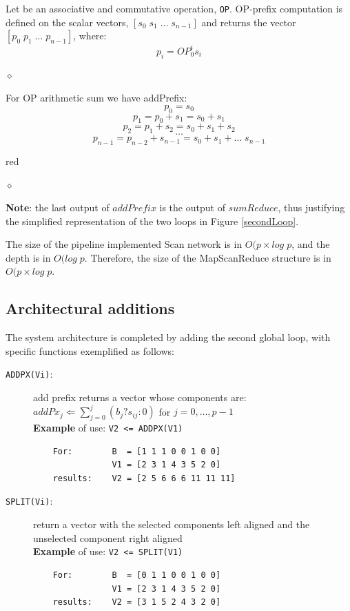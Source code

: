 \begin{definition}
Let be an associative and commutative  operation, {\tt OP}. OP-prefix computation is defined on the scalar vectors, $[s_0 \; s_1 \; \ldots \; s_{n-1}]$ and returns the vector $[p_0 \; p_1 \; \ldots \; p_{n-1}]$, where:
$$ p_i = OP_0^i s_i$$

$\diamond$
\end{definition}
\begin{exemplu}
For OP arithmetic sum we have addPrefix:
$$p_0 = s_0$$
$$p_1 = p_0 + s_1 = s_0 + s_1$$
$$p_2 = p_1 + s_2 = s_0 +s_1 + s_2$$
$$\ldots$$
$$p_{n-1} = p_{n-2} + s_{n-1} = s_0 + s_1 + \ldots \; s_{n-1}$$

 {red}


$\diamond$
\end{exemplu}

{\bf Note}: the last output of $addPrefix$ is the output of $sumReduce$, thus justifying the simplified representation of the two loops in Figure \ref{secondLoop}.

The size of the pipeline implemented Scan network is in $O(p \times log \; p$, and the depth is in $O(log \; p$. Therefore, the size of the MapScanReduce structure is in $O(p \times log \; p$.

\subsection{Architectural additions}\label{scanEx}

The system architecture is completed by adding the second global loop, with  specific functions exemplified as follows:
\begin{description}
    \item[{\tt ADDPX(Vi)}:] add prefix returns a vector whose components are:\\
        $addPx_j \Leftarrow \sum_{j=0}^{j} (b_j ? s_{ij} : 0)$ for $j = 0, \ldots, p-1$ \\
         {\bf Example} of use: {\tt V2 <= ADDPX(V1)} 
    \begin{verbatim}
    For:        B  = [1 1 1 0 0 1 0 0]
                V1 = [2 3 1 4 3 5 2 0]
    results:    V2 = [2 5 6 6 6 11 11 11]
    \end{verbatim}
    \item[{\tt SPLIT(Vi)}:] return a vector with the selected components left aligned and the unselected component right aligned  \\
     {\bf Example} of use: {\tt V2 <= SPLIT(V1)} 
    \begin{verbatim}
    For:        B  = [0 1 1 0 0 1 0 0]
                V1 = [2 3 1 4 3 5 2 0]
    results:    V2 = [3 1 5 2 4 3 2 0]
    \end{verbatim}
\end{description}


